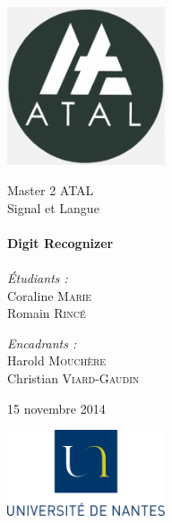 
\begin{titlepage}
	\begin{center}

		\includegraphics[width=0.35\textwidth]{Figures/ATAL.png}~

		\LARGE{Master 2 \textsc{ATAL}}\\[1.5cm]

		\Large{Signal et Langue}\\[0.5cm]

		\HRule \\[0.4cm]
		{ \huge \bfseries Digit Recognizer \\[0.4cm] }
		\HRule \\[1.5cm]

		\normalsize		
		\emph{\'Etudiants :}\\
		Coraline \textsc{Marie}\\
		Romain \textsc{Rincé}

		\vspace{0.5cm}

		\emph{Encadrants :} \\
		Harold \textsc{Mouchère}\\
		Christian \textsc{Viard-Gaudin} 

		\vspace{1cm}

		{\large 15 novembre 2014}

		\vfill

		
		\includegraphics[width=0.35\textwidth]{Figures/logoUN.png}~\\[2cm]

		

	\end{center}
\end{titlepage}

